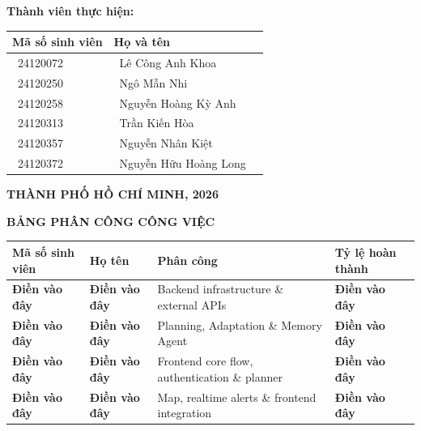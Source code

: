 \documentclass[12pt,a4paper]{article}
\newcommand{\dienvao}{\textbf{Điền vào đây}}
\begin{document}
\begin{titlepage}
\begin{center}
        \vfill
        \textbf{Thành viên thực hiện:} \\
        \vspace{0.5cm}
        \begin{tabular}{|l|l|l|}
            \hline
            \textbf{Mã số sinh viên} & \textbf{Họ và tên} \\
            \hline
            \ 24120072 & \ Lê Công Anh Khoa \\
            \hline
            \ 24120250 & \ Ngô Mẫn Nhi \\
            \hline
            \ 24120258 & \ Nguyễn Hoàng Kỳ Anh \\
            \hline
            \ 24120313 & \ Trần Kiến Hòa \\
            \hline
            \ 24120357 & \ Nguyễn Nhân Kiệt \\
            \hline
            \ 24120372 & \ Nguyễn Hữu Hoàng Long \\
            \hline
        \end{tabular}

        \vfill
        {\fontsize{14pt}{20pt}\selectfont \textbf{THÀNH PHỐ HỒ CHÍ MINH, 2026}}
    \end{center}
\end{titlepage}

\newpage
\pagestyle{empty}
\begin{center}
{\LARGE\bfseries BẢNG PHÂN CÔNG CÔNG VIỆC}
\end{center}
\vspace{1.0cm}

\renewcommand{\arraystretch}{2.0}
\begin{center}
\begin{tabular}{|C{2.5cm}|C{3.5cm}|C{5.0cm}|C{2.8cm}|}
    \hline
    \textbf{Mã số sinh viên} & \textbf{Họ tên} & \textbf{Phân công} & \textbf{Tỷ lệ hoàn thành} \\ \hline
    \dienvao & \dienvao & Backend infrastructure \& external APIs & \dienvao \\ \hline
    \dienvao & \dienvao & Planning, Adaptation \& Memory Agent & \dienvao \\ \hline
    \dienvao & \dienvao & Frontend core flow, authentication \& planner & \dienvao \\ \hline
    \dienvao & \dienvao & Map, realtime alerts \& frontend integration & \dienvao \\ \hline
\end{tabular}
\end{center}
\renewcommand{\arraystretch}{1.0}
\end{document}
